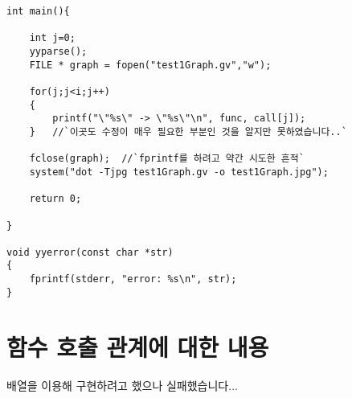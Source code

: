 \documentclass{article}
\begin{document}
\begin{lstlisting}[escapeinside=``]
int main(){
	
	int j=0;
	yyparse();
    FILE * graph = fopen("test1Graph.gv","w");
    
	for(j;j<i;j++)
	{
		printf("\"%s\" -> \"%s\"\n", func, call[j]);
	}   //`이곳도 수정이 매우 필요한 부분인 것을 알지만 못하였습니다..`
	
    fclose(graph);  //`fprintf를 하려고 약간 시도한 흔적`
    system("dot -Tjpg test1Graph.gv -o test1Graph.jpg");
	
	return 0;

}

void yyerror(const char *str)
{
	fprintf(stderr, "error: %s\n", str);
}

\end{lstlisting}

\section{함수 호출 관계에 대한 내용}
배열을 이용해 구현하려고 했으나 실패했습니다...
\end{document}
